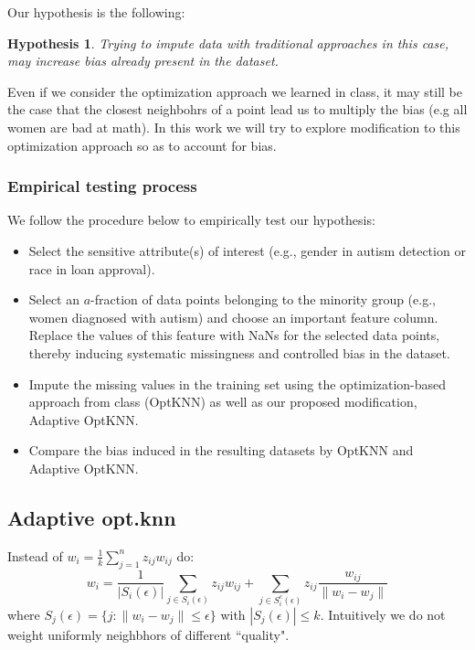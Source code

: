 \documentclass{article}
\newtheorem{hyp}{Hypothesis}
\begin{document}
Our hypothesis is the following:
\begin{hyp}
Trying to impute data with traditional approaches in this case, may increase bias already present in the dataset.
\end{hyp}
Even if we consider the optimization approach we learned in class, it may still be the case that the closest neighbohrs of a point lead us to multiply the bias (e.g all women are bad at math).  In this work we will try to explore modification to this optimization approach so as to account for bias.

\subsubsection{Empirical testing process}
We follow the procedure below to empirically test our hypothesis:
\begin{itemize}
    \item Select the sensitive attribute(s) of interest (e.g., gender in autism detection or race in loan approval).
    \item Select an \(a\)-fraction of data points belonging to the minority group (e.g., women diagnosed with autism) and choose an important feature column. Replace the values of this feature with NaNs for the selected data points, thereby inducing systematic missingness and controlled bias in the dataset.
    \item Impute the missing values in the training set using the optimization-based approach from class (OptKNN) as well as our proposed modification, Adaptive OptKNN.
    \item Compare the bias induced in the resulting datasets by OptKNN and Adaptive OptKNN.
\end{itemize}



\subsection{Adaptive opt.knn}
Instead of $w_i = \frac{1}{k}\sum\limits_{j=1}^n z_{ij}w_{ij}$ do:
$$w_i =  \frac{1}{|S_i(\epsilon)|}\sum\limits_{j \in S_i(\epsilon)} z_{ij}w_{ij} +
        \sum\limits_{j \in S^c_i(\epsilon)}z_{ij}\frac{w_{ij}}{\|w_i- w_j\|}
$$
where $S_j(\epsilon) = \{j: \|w_i - w_j\| \leq \epsilon\}$ with $|S_j(\epsilon)|\leq k$. Intuitively we do not weight uniformly neighbhors of different ``quality". 
\end{document}
